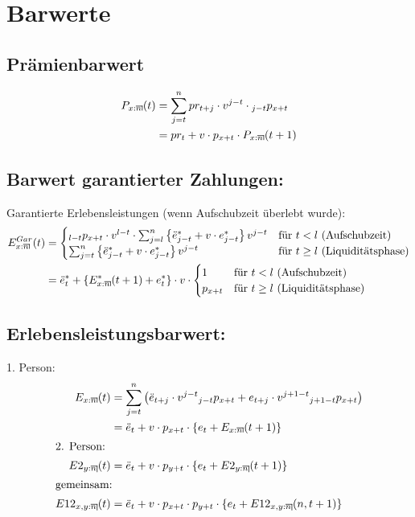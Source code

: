 \documentclass[a4paper,10pt]{article}
\makeatletter
\newcommand{\xn}{{\act[x]{n}}}
\DeclareRobustCommand{\act}[2][]{%
\def\arraystretch{0}%
\setlength\arraycolsep{0.5pt}%
\setlength\arrayrulewidth{0.5pt}%
\setbox0=\hbox{$\scriptstyle#1\ifx#1\empty{asdf}\else:\fi#2$}%
\begin{array}[b]{*2{@{}>{\scriptstyle}c}|}
\cline{2-2}%
\rule[1.25pt]{0pt}{\ht0}%
#1\ifx#1\empty\else:\fi & #2%
\end{array}%
}
\makeatother
\begin{document}
\pagebreak

\section{Barwerte}

\subsection{Prämienbarwert}

\begin{align*} 
P_\xn(t) &= \sum_{j=t}^n pr_{t+j} \cdot v^{j-t}  \cdot {}_{j-t}p_{x+t}\\
	  &= pr_{t} + v \cdot p_{x+t} \cdot P_\xn(t+1)
\end{align*}

\subsection{Barwert garantierter Zahlungen:}
Garantierte Erlebensleistungen (wenn Aufschubzeit überlebt wurde):
\begin{align*} 
 E^{Gar}_\xn(t) &= \begin{cases}
		    {}_{l-t}p_{x+t} \cdot v^{l-t} \cdot \sum_{j=l}^{n} \left\{\ddot{e}^{*}_{j-t}+ v\cdot e^*_{j-t}\right\} v^{j-t} & \text{für $t<l$ (Aufschubzeit)}\\
		    \sum_{j=t}^{n} \left\{\ddot{e}^{*}_{j-t}+ v\cdot e^*_{j-t}\right\} v^{j-t} & \text{für $t\ge l$ (Liquiditätsphase)}
                 \end{cases}\\
   &= \ddot{e}_t^{*} + \left\{E^{*}_\xn(t+1) + e_t^*\right\}\cdot v \cdot \begin{cases}
	    1 & \text{für $t<l$ (Aufschubzeit)}\\
            p_{x+t} & \text{für $t\ge l$ (Liquiditätsphase)}
       \end{cases}
\end{align*}


\subsection{Erlebensleistungsbarwert:}
1. Person:
\begin{align*} 
E_\xn(t) &= \sum_{j=t}^n \left(\ddot{e}_{t+j} \cdot v^{j-t}  {}_{j-t}p_{x+t} + e_{t+j} \cdot v^{j+1-t} {}_{j+1-t}p_{x+t} \right)\\
	  &= \ddot{e}_{t} + v \cdot p_{x+t} \cdot \left\{ e_t + E_\xn(t+1)\right\}\\
\intertext{2. Person:}
E2_{\act[y]{n}}(t) &= \ddot{e}_{t} + v \cdot p_{y+t} \cdot \left\{ e_t + E2_{\act[y]{n}}(t+1)\right\}\\
\intertext{gemeinsam:}
E12_{\act[x,y]{n}}(t) &= \ddot{e}_{t} + v \cdot p_{x+t} \cdot p_{y+t} \cdot \left\{ e_t + E12_{\act[x,y]{n}}(n,t+1)\right\}\\
\end{align*}
\end{document}
